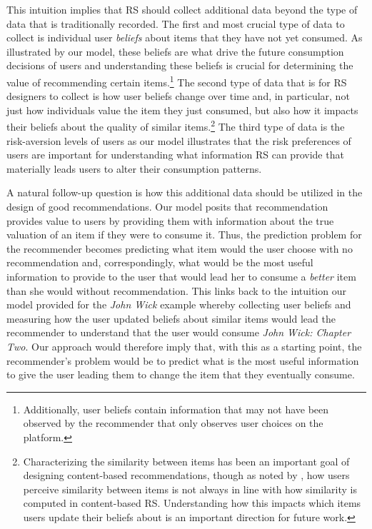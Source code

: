 \documentclass[manuscript]{acmart}
\begin{document}
This intuition implies that RS should collect additional data beyond the type of data that is traditionally recorded. The first and most crucial type of data to collect is individual user \textit{beliefs} about items that they have not yet consumed. As illustrated by our model, these beliefs are what drive the future consumption decisions of users and understanding these beliefs is crucial for determining the value of recommending certain items.\footnote{Additionally, user beliefs contain information that may not have been observed by the recommender that only observes user choices on the platform.} The second type of data that is  for RS designers to collect is how user beliefs change over time and, in particular, not just how individuals value the item they just consumed, but also how it impacts their beliefs about the quality of similar items.\footnote{Characterizing the similarity between items has been an important goal of designing content-based recommendations, though as noted by \cite{winecoff2019users}, how users perceive similarity between items is not always in line with how similarity is computed in content-based RS. Understanding how this impacts which items users update their beliefs about is an important direction for future work.} The third type of data is the risk-aversion levels of users as our model illustrates that the risk preferences of users are important for understanding what information RS can provide that materially leads users to alter their consumption patterns.
\par 
A natural follow-up question is how this additional data should be utilized in the design of good recommendations. Our model posits that recommendation provides value to users by providing them with information about the true valuation of an item if they were to consume it. Thus, the prediction problem for the recommender becomes predicting what item would the user choose with no recommendation and, correspondingly, what would be the most useful information to provide to the user that would lead her to consume a \textit{better} item than she would without recommendation. This links back to the intuition our model provided for the \textit{John Wick} example whereby collecting user beliefs and measuring how the user updated beliefs about similar items would lead the recommender to understand that the user would consume \textit{John Wick: Chapter Two}. Our approach would therefore imply that, with this as a starting point, the recommender's problem would be to predict what is the most useful information to give the user leading them to change the item that they eventually consume.
\end{document}
